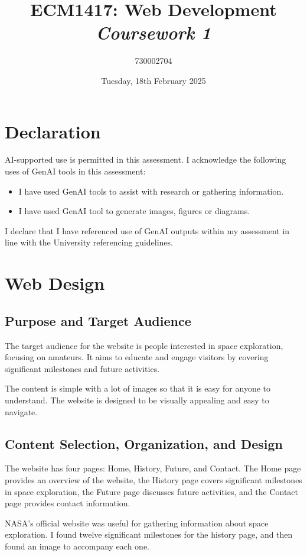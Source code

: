 \documentclass{article}
\title{\textbf{ECM1417: Web Development} \\ \textit{Coursework 1}}
\author{730002704}
\date{Tuesday, 18th February 2025}
\begin{document}
\maketitle
\tableofcontents

\section*{Declaration}
AI-supported use is permitted in this assessment. I acknowledge the following uses of GenAI tools in this assessment:
\begin{itemize}
    \item I have used GenAI tools to assist with research or gathering information.
    \item I have used GenAI tool to generate images, figures or diagrams.
\end{itemize}
I declare that I have referenced use of GenAI outputs within my assessment in line with the University referencing guidelines.

\section{Web Design}
\subsection{Purpose and Target Audience}
The target audience for the website is people interested in space exploration, focusing on amateurs. It aims to educate and engage visitors by covering significant milestones and future activities.

The content is simple with a lot of images so that it is easy for anyone to understand. The website is designed to be visually appealing and easy to navigate.

\subsection{Content Selection, Organization, and Design}
The website has four pages: Home, History, Future, and Contact. The Home page provides an overview of the website, the History page covers significant milestones in space exploration, the Future page discusses future activities, and the Contact page provides contact information.

NASA's official website was useful for gathering information about space exploration. I found twelve significant milestones for the history page, and then found an image to accompany each one.
\end{document}
